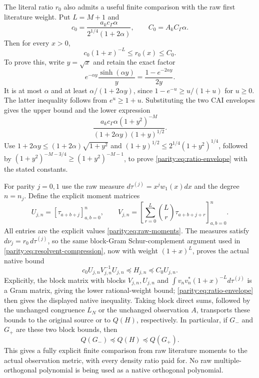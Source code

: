 The literal ratio $r_0$ also admits a useful finite comparison
with the raw first literature weight. Put $L=M+1$ and
\begin{equation}\label{parity:eq:ratio-constants}
 c_0=\frac{a_kc_\Gamma\alpha}{2^{1/4}(1+2\alpha)},
 \qquad C_0=A_kC_\Gamma\alpha.
\end{equation}
Then for every $x>0$,
\begin{equation}\label{parity:eq:ratio-envelope}
 c_0(1+x)^{-L}\leq r_0(x)\leq C_0.
\end{equation}
To prove this, write $y=\sqrt x$ and retain the exact factor
\[
 e^{-\alpha y}\frac{\sinh(\alpha y)}y
    =\frac{1-e^{-2\alpha y}}{2y}.
\]
It is at most $\alpha$ and at least
$\alpha/(1+2\alpha y)$, since $1-e^{-u}\geq u/(1+u)$ for $u\geq0$.
The latter inequality follows from $e^u\geq1+u$.
Substituting the two CAI envelopes gives the upper bound and the
lower expression
\[
 \frac{a_kc_\Gamma\alpha(1+y^2)^{-M}}
                   {(1+2\alpha y)(1+y)^{1/2}}.
\]
Use $1+2\alpha y\leq(1+2\alpha)\sqrt{1+y^2}$ and
$(1+y)^{1/2}\leq2^{1/4}(1+y^2)^{1/4}$, followed by
$(1+y^2)^{-M-3/4}\geq(1+y^2)^{-M-1}$, to prove
\eqref{parity:eq:ratio-envelope} with the stated constants.

For parity $j=0,1$ use the raw measure
$d\tau^{(j)}=x^jw_1(x)dx$ and the degree $n=n_j$. Define the
explicit moment matrices
\[
 U_{j,n}=[\tau_{a+b+j}]_{a,b=0}^n,\qquad
 V_{j,n}=\left[\sum_{r=0}^L\binom Lr\tau_{a+b+j+r}\right]_{a,b=0}^n.
\]
All entries are the explicit values \eqref{parity:eq:raw-moments}.
The measures satisfy $d\nu_j=r_0\,d\tau^{(j)}$, so the same
block-Gram Schur-complement argument used in
\eqref{parity:eq:resolvent-compression}, now with weight $(1+x)^L$,
proves the actual native bound
\begin{equation}\label{parity:eq:raw-matrix-bound}
 \boxed{c_0 U_{j,n}V_{j,n}^{-1}U_{j,n}
             \preceq H_{j,n}\preceq C_0U_{j,n}.}
\end{equation}
Explicitly, the block matrix with blocks $V_{j,n},U_{j,n}$ and
$\int v_nv_n^*(1+x)^{-L}d\tau^{(j)}$ is a Gram matrix, giving
the lower rational-weight bound; \eqref{parity:eq:ratio-envelope}
then gives the displayed native inequality.
Taking block direct sums, followed by the unchanged congruence
$L_N$ or the unchanged observation $A$, transports these bounds
to the original source or to $Q(H)$, respectively. In particular,
if $G_-$ and $G_+$ are these two block bounds, then
\[
 Q(G_-)\preceq Q(H)\preceq Q(G_+).
\]
This gives a fully explicit finite comparison from raw literature
moments to the actual observation metric, with every density
ratio paid for. No raw multiple-orthogonal polynomial is being
used as a native orthogonal polynomial.

